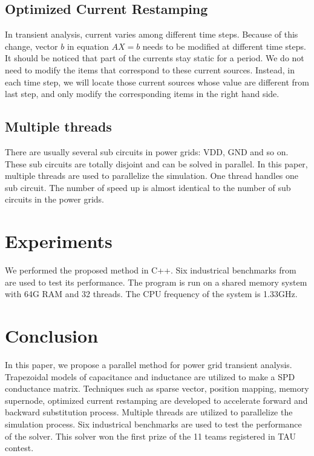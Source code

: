 \documentclass[conference]{IEEEtran}
\begin{document}
  \subsection{Optimized Current Restamping}
In transient analysis, current varies among different time steps. Because of this change, vector $b$ in equation $AX=b$ needs to be 
modified at different time steps. It should be noticed that part of the currents stay static for a period. We do not need to modify
the items that correspond to these current sources. Instead, in each time step, we will locate those current sources whose value are
different from last step, and only modify the corresponding items in the right hand side. 
  \subsection{Multiple threads}
There are usually several sub circuits in power grids: VDD, GND and so on. These sub circuits are totally disjoint and can be solved
in parallel. In this paper, multiple threads are used to parallelize the simulation. One thread handles one sub circuit. The number of
speed up is almost identical to the number of sub circuits in the power grids.
\section{Experiments}
We performed the proposed method in C++. Six industrical benchmarks from \cite{IBM} are used to test its performance. The
program is run on a shared memory system with 64G RAM and 32 threads. The CPU frequency of the system is 1.33GHz. 

\section{Conclusion}
In this paper, we propose a parallel method for power grid transient analysis. Trapezoidal models of capacitance and inductance are 
utilized to make a SPD conductance matrix. Techniques such as sparse vector, position mapping, memory supernode, optimized current 
restamping are developed to accelerate forward and backward substitution process. Multiple threads are utilized to parallelize the
simulation process. Six industrical benchmarks are used to test the performance of the solver. This solver won the first prize of the
11 teams registered in TAU contest.


\end{document}
